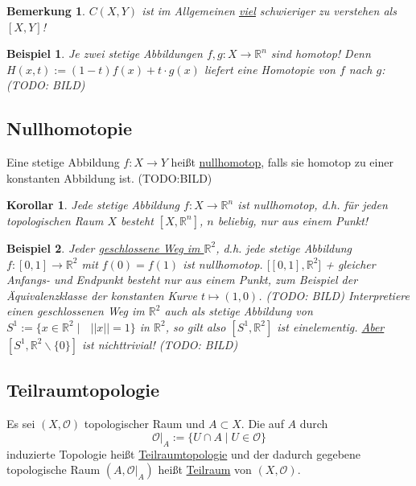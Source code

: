 \documentclass[a4paper,11pt,notitlepage]{report}
\newtheorem{definition}{Definition}[chapter]
\newtheorem{corollary}{Korollar}[chapter]
\newtheorem{remark}{Bemerkung}[chapter]
\newtheorem{example}{Beispiel}[chapter]
\newcommand{\R}{{\ensuremath{\mathbb{R}}}}
\newcommand{\OO}{{\ensuremath{\mathcal{O}}}}
\newenvironment{Kasten}[1]
{
\hspace{0.05\linewidth}
\begin{center}
\begin{minipage}{0.9\linewidth}
\setlength{\fboxsep}{18pt}
\definecolor{shadecolor}{gray}{0.9}
\definecolor{framecolor}{gray}{0}
\def\FrameCommand{\fcolorbox{framecolor}{shadecolor}}
\MakeFramed {\FrameRestore}
\subsection{#1}
\begin{itshape}
}
{
\end{itshape}
\endMakeFramed
\end{minipage}
\end{center}
\vspace{1em}
}
\begin{document}
\begin{remark}
$C(X,Y)$ ist im Allgemeinen \underline{\underline{viel}} schwieriger zu verstehen als $[X,Y]$!
\end{remark}

\begin{example}
Je zwei stetige Abbildungen $f,g \colon X \rightarrow \R^n$ sind homotop! Denn $H(x,t):= (1-t) f(x) + t \cdot g(x)$ liefert eine Homotopie von $f$ nach $g$: (TODO: BILD)
\end{example}

\begin{Kasten}{Nullhomotopie}
Eine stetige Abbildung $f \colon X \rightarrow Y$ heißt \underline{nullhomotop}, falls sie homotop zu einer konstanten Abbildung ist. (TODO:BILD)
\end{Kasten}

\begin{corollary}
Jede stetige Abbildung $f \colon X \rightarrow \R^n$ ist nullhomotop, d.h. für jeden topologischen Raum $X$ besteht $[X, \R^n]$, $n$ beliebig, nur aus einem Punkt!
\end{corollary}

\begin{example}
Jeder \underline{geschlossene Weg im $\R^2$}, d.h. jede stetige Abbildung $f \colon [0,1] \rightarrow \R^2$ mit $f(0) = f(1)$ ist nullhomotop.
$\bigl[[0,1], \R^2\bigr]$ + gleicher Anfangs- und Endpunkt besteht nur aus einem Punkt, zum Beispiel der Äquivalenzklasse der konstanten Kurve $t \mapsto (1,0)$. (TODO: BILD)
Interpretiere einen geschlossenen Weg im $\R^2$ auch als stetige Abbildung von $S^1 := \{ x \in \R^2 \mid \text{ } ||x|| = 1\}$ in $\R^2$, so gilt also $[S^1, \R^2]$ ist einelementig.
\newline
\underline{Aber} $[S^1, \R^2 \backslash \{0\}]$ ist nichttrivial! (TODO: BILD)
\end{example}

\begin{Kasten}{Teilraumtopologie}
Es sei $(X, \OO)$ topologischer Raum und $A \subset X$. Die auf $A$ durch
$$\OO \Big |_{A} := \{U \cap A \mid U \in \OO \}$$
induzierte Topologie heißt \underline{Teilraumtopologie} und der dadurch gegebene topologische Raum $(A, \OO \Big |_{A})$ heißt \underline{Teilraum} von $(X, \OO)$.
\end{Kasten}
\end{document}
